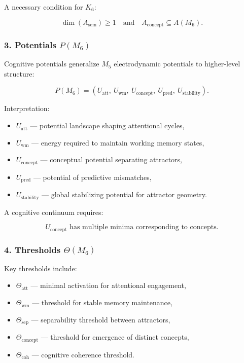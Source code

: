 A necessary condition for $K_6$:

\[
\dim(A_{\mathrm{sem}}) \ge 1
\quad\text{and}\quad 
A_{\mathrm{concept}} \subseteq A(M_6).
\]

\subsubsection*{3. Potentials \texorpdfstring{$P(M_6)$}{P(M_6)}}

Cognitive potentials generalize $M_5$ electrodynamic potentials to higher-level structure:

\[
P(M_6) = 
(U_{\mathrm{att}},\
U_{\mathrm{wm}},\
U_{\mathrm{concept}},\
U_{\mathrm{pred}},\
U_{\mathrm{stability}}).
\]

Interpretation:

\begin{itemize}
    \item $U_{\mathrm{att}}$ — potential landscape shaping attentional cycles,
    \item $U_{\mathrm{wm}}$ — energy required to maintain working memory states,
    \item $U_{\mathrm{concept}}$ — conceptual potential separating attractors,
    \item $U_{\mathrm{pred}}$ — potential of predictive mismatches,
    \item $U_{\mathrm{stability}}$ — global stabilizing potential for attractor geometry.
\end{itemize}

A cognitive continuum requires:

\[
U_{\mathrm{concept}} \text{ has multiple minima corresponding to concepts}.
\]

\subsubsection*{4. Thresholds \texorpdfstring{$\Theta(M_6)$}{\Theta(M_6)}}

Key thresholds include:

\begin{itemize}
    \item $\Theta_{\mathrm{att}}$ — minimal activation for attentional engagement,
    \item $\Theta_{\mathrm{wm}}$ — threshold for stable memory maintenance,
    \item $\Theta_{\mathrm{sep}}$ — separability threshold between attractors,
    \item $\Theta_{\mathrm{concept}}$ — threshold for emergence of distinct concepts,
    \item $\Theta_{\mathrm{coh}}$ — cognitive coherence threshold.
\end{itemize}

